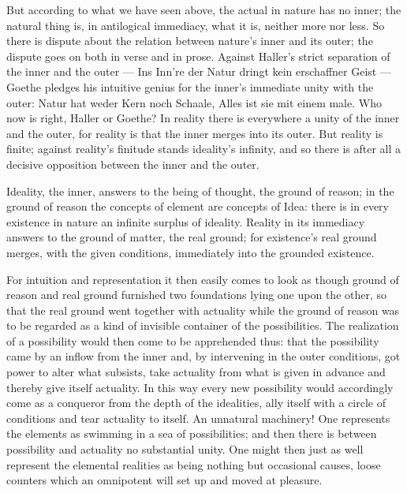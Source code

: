 \documentclass[12pt,a4paper]{book}
\begin{document}
But according to what we have seen above, the actual in nature has no inner; the natural thing is, in antilogical
immediacy, what it is, neither more nor less. So there is dispute about the relation between nature's inner and its
outer; the dispute goes on both in verse and in prose. Against Haller's strict
separation of the inner and the outer --- Ins Inn're der Natur dringt kein erschaffner Geist --- Goethe pledges his
intuitive genius for the inner's immediate unity with the outer: Natur hat weder Kern noch Schaale, Alles ist sie mit
einem male. Who now is right, Haller or Goethe? In reality there is everywhere a unity of the inner and the outer,
for reality is that the inner merges into its outer. But reality is finite; against reality's finitude stands
ideality's infinity, and so there is after all a decisive opposition between the inner and the outer.

Ideality, the inner, answers to the being of thought, the ground of reason; in the ground of reason the concepts of
element are concepts of Idea: there is in every existence in nature an infinite surplus of ideality. Reality in its
immediacy answers to the ground of matter, the real ground; for existence's real ground merges, with the given
conditions, immediately into the grounded existence.

For intuition and representation it then easily comes to look as though ground of reason and real ground furnished two
foundations lying one upon the other, so that the real ground went together with actuality while the ground of reason
was to be regarded as a kind of invisible container of the possibilities. The realization of a possibility would then
come to be apprehended thus: that the possibility came by an inflow from the inner and, by intervening in the outer
conditions, got power to alter what subsists, take actuality from what is given in advance and thereby give itself
actuality. In this way every new possibility would accordingly come as a conqueror from the depth of the idealities,
ally itself with a circle of conditions and tear actuality to itself. An unnatural machinery! One represents the
elements as swimming in a sea of possibilities; and then there is between possibility and actuality no substantial
unity. One might then just as well represent the elemental realities as being nothing but occasional causes, loose
counters which an omnipotent will set up and moved at pleasure.
\end{document}
